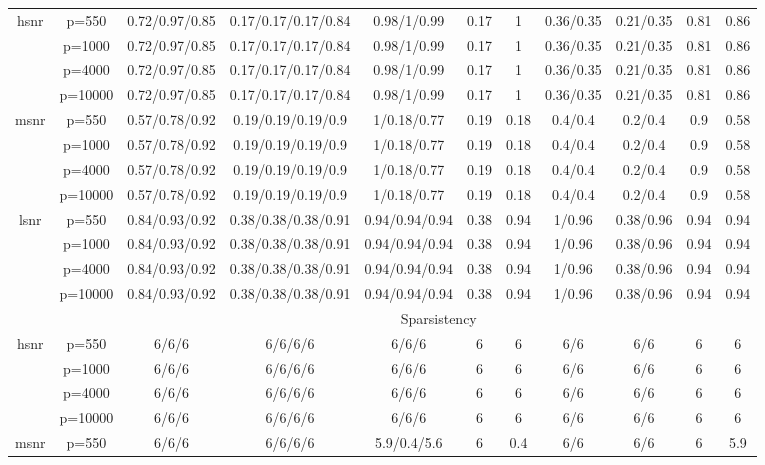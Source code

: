 \begin{table}[ht]
{\begin{tabular}{|c|c|ccccccccc|}
\midrule\multirow{4}[2]{*}{hsnr} & p=550 & 0.72/0.97/0.85 & 0.17/0.17/0.17/0.84 & 0.98/1/0.99 & 0.17 & 1 & 0.36/0.35 & 0.21/0.35 & 0.81 & 0.86 \\ 
   & p=1000 & 0.72/0.97/0.85 & 0.17/0.17/0.17/0.84 & 0.98/1/0.99 & 0.17 & 1 & 0.36/0.35 & 0.21/0.35 & 0.81 & 0.86 \\ 
   & p=4000 & 0.72/0.97/0.85 & 0.17/0.17/0.17/0.84 & 0.98/1/0.99 & 0.17 & 1 & 0.36/0.35 & 0.21/0.35 & 0.81 & 0.86 \\ 
   & p=10000 & 0.72/0.97/0.85 & 0.17/0.17/0.17/0.84 & 0.98/1/0.99 & 0.17 & 1 & 0.36/0.35 & 0.21/0.35 & 0.81 & 0.86 \\ 
  \midrule\multirow{4}[2]{*}{msnr} & p=550 & 0.57/0.78/0.92 & 0.19/0.19/0.19/0.9 & 1/0.18/0.77 & 0.19 & 0.18 & 0.4/0.4 & 0.2/0.4 & 0.9 & 0.58 \\ 
   & p=1000 & 0.57/0.78/0.92 & 0.19/0.19/0.19/0.9 & 1/0.18/0.77 & 0.19 & 0.18 & 0.4/0.4 & 0.2/0.4 & 0.9 & 0.58 \\ 
   & p=4000 & 0.57/0.78/0.92 & 0.19/0.19/0.19/0.9 & 1/0.18/0.77 & 0.19 & 0.18 & 0.4/0.4 & 0.2/0.4 & 0.9 & 0.58 \\ 
   & p=10000 & 0.57/0.78/0.92 & 0.19/0.19/0.19/0.9 & 1/0.18/0.77 & 0.19 & 0.18 & 0.4/0.4 & 0.2/0.4 & 0.9 & 0.58 \\ 
  \midrule\multirow{4}[2]{*}{lsnr} & p=550 & 0.84/0.93/0.92 & 0.38/0.38/0.38/0.91 & 0.94/0.94/0.94 & 0.38 & 0.94 & 1/0.96 & 0.38/0.96 & 0.94 & 0.94 \\ 
   & p=1000 & 0.84/0.93/0.92 & 0.38/0.38/0.38/0.91 & 0.94/0.94/0.94 & 0.38 & 0.94 & 1/0.96 & 0.38/0.96 & 0.94 & 0.94 \\ 
   & p=4000 & 0.84/0.93/0.92 & 0.38/0.38/0.38/0.91 & 0.94/0.94/0.94 & 0.38 & 0.94 & 1/0.96 & 0.38/0.96 & 0.94 & 0.94 \\ 
   & p=10000 & 0.84/0.93/0.92 & 0.38/0.38/0.38/0.91 & 0.94/0.94/0.94 & 0.38 & 0.94 & 1/0.96 & 0.38/0.96 & 0.94 & 0.94 \\ 
   \midrule 
 \multicolumn{1}{|c}{} &       & \multicolumn{9}{c|}{Sparsistency} \\
\midrule\multirow{4}[2]{*}{hsnr} & p=550 & 6/6/6 & 6/6/6/6 & 6/6/6 & 6 & 6 & 6/6 & 6/6 & 6 & 6 \\ 
   & p=1000 & 6/6/6 & 6/6/6/6 & 6/6/6 & 6 & 6 & 6/6 & 6/6 & 6 & 6 \\ 
   & p=4000 & 6/6/6 & 6/6/6/6 & 6/6/6 & 6 & 6 & 6/6 & 6/6 & 6 & 6 \\ 
   & p=10000 & 6/6/6 & 6/6/6/6 & 6/6/6 & 6 & 6 & 6/6 & 6/6 & 6 & 6 \\ 
  \midrule\multirow{4}[2]{*}{msnr} & p=550 & 6/6/6 & 6/6/6/6 & 5.9/0.4/5.6 & 6 & 0.4 & 6/6 & 6/6 & 6 & 5.9 \\ 

\end{tabular}}
\end{table}
